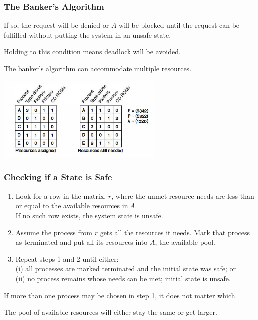 \begin{frame}
	\frametitle{The Banker's Algorithm}

	If so, the request will be denied or $A$ will be blocked until the request can be fulfilled without putting the system in an unsafe state.

	Holding to this condition means deadlock will be avoided.

	The banker's algorithm can accommodate multiple resources.

	\begin{center}
		\includegraphics[width=0.6\textwidth]{images/bankers-multiple.png}
	\end{center}


\end{frame}

\begin{frame}
	\frametitle{Checking if a State is Safe}

	\begin{enumerate}
		\item Look for a row in the matrix, $r$, where the unmet resource needs are less than or equal to the available resources in $A$.\\
		      \quad If no such row exists, the system state is unsafe.
		\item Assume the process from $r$ gets all the resources it needs. Mark that process as terminated and put all its resources into $A$, the available pool.
		\item Repeat steps 1 and 2 until either:\\
		      \quad (i) all processes are marked terminated and the initial state was safe; or \\
		      \quad (ii) no process remains whose needs can be met; initial state is unsafe.
	\end{enumerate}

	If more than one process may be chosen in step 1, it does not matter which.

	The pool of available resources will either stay the same or get larger.

\end{frame}

